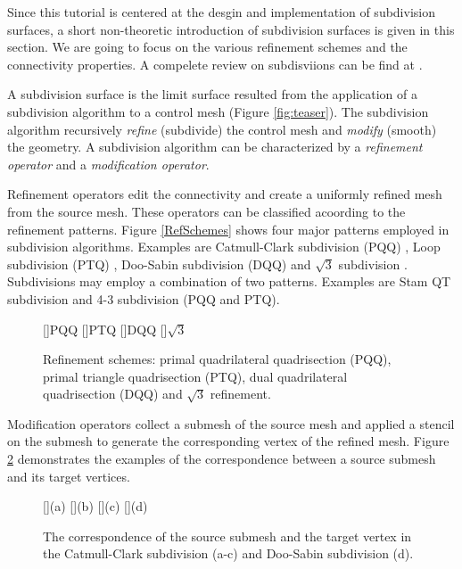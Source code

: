 Since this tutorial is centered at the desgin and implementation
of subdivision surfaces, a short non-theoretic introduction of 
subdivision surfaces is given in this section. We are going to 
focus on the various refinement schemes and the connectivity 
properties. A compelete review on subdisviions can be find at 
\cite{siggraph1998notes}.

A subdivision surface is the limit surface resulted from the
application of a subdivision algorithm to a control mesh
(Figure \ref{fig:teaser}). The subdivision algorithm  
recursively \emph{refine} (subdivide) the control mesh and 
\emph{modify} (smooth) the geometry. A subdivision 
algorithm can be characterized by a \emph{refinement operator} 
and a \emph{modification operator}. 

Refinement operators edit the connectivity
and create a uniformly refined mesh from the source mesh.
These operators can be classified acoording to the refinement
patterns. Figure \ref{RefSchemes} shows four major patterns employed
in subdivision algorithms. Examples are 
Catmull-Clark subdivision (PQQ) \cite{cc},
Loop subdivision (PTQ) \cite{loop}, 
Doo-Sabin subdivision (DQQ) \cite{ds}
and $\sqrt{3}$ subdivision \cite{sqrt3}.
Subdivisions may employ a combination of two patterns.
Examples are Stam QT subdivision \cite{sqt} and 
4-3 subdivision \cite{43} (PQQ and PTQ).

\begin{figure}
  \centering
  []{\scriptsize PQQ} 
  []{\scriptsize PTQ}
  []{\scriptsize DQQ} 
  []{\scriptsize $\sqrt{3}$} 
  \caption{Refinement schemes: 
    primal quadrilateral quadrisection (PQQ),
    primal triangle quadrisection (PTQ),
    dual quadrilateral quadrisection (DQQ) and
    $\sqrt{3}$ refinement.}
  \label{fig:RefSchemes}
\end{figure}

Modification operators collect a submesh of the source
mesh and applied a stencil on the submesh to
generate the corresponding vertex of the refined mesh.
Figure \ref{fig:RefMap} demonstrates the examples of 
the correspondence between a source submesh and 
its target vertices.

\begin{figure}
  \centering
  []{(a)}
  []{(b)}
  []{(c)}
  []{(d)}
  \caption{The correspondence of the source submesh and the 
           target vertex in the Catmull-Clark subdivision (a-c)
	   and Doo-Sabin subdivision (d). }
  \label{fig:RefMap}
\end{figure}

